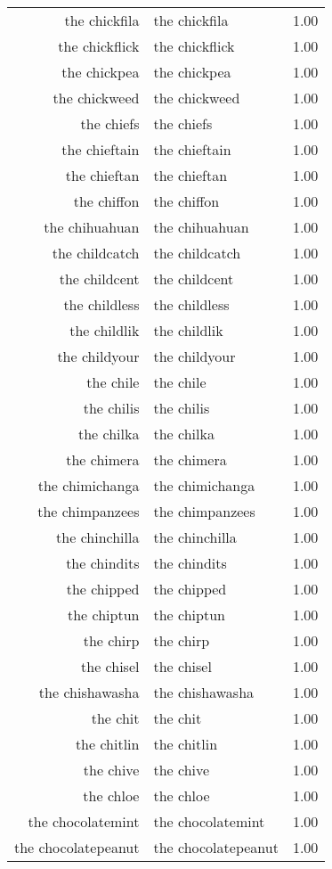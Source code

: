 \begin{table}[ht]
\begin{tabular}{rlr}
  the chickfila & the chickfila & 1.00 \\ 
  the chickflick & the chickflick & 1.00 \\ 
  the chickpea & the chickpea & 1.00 \\ 
  the chickweed & the chickweed & 1.00 \\ 
  the chiefs & the chiefs & 1.00 \\ 
  the chieftain & the chieftain & 1.00 \\ 
  the chieftan & the chieftan & 1.00 \\ 
  the chiffon & the chiffon & 1.00 \\ 
  the chihuahuan & the chihuahuan & 1.00 \\ 
  the childcatch & the childcatch & 1.00 \\ 
  the childcent & the childcent & 1.00 \\ 
  the childless & the childless & 1.00 \\ 
  the childlik & the childlik & 1.00 \\ 
  the childyour & the childyour & 1.00 \\ 
  the chile & the chile & 1.00 \\ 
  the chilis & the chilis & 1.00 \\ 
  the chilka & the chilka & 1.00 \\ 
  the chimera & the chimera & 1.00 \\ 
  the chimichanga & the chimichanga & 1.00 \\ 
  the chimpanzees & the chimpanzees & 1.00 \\ 
  the chinchilla & the chinchilla & 1.00 \\ 
  the chindits & the chindits & 1.00 \\ 
  the chipped & the chipped & 1.00 \\ 
  the chiptun & the chiptun & 1.00 \\ 
  the chirp & the chirp & 1.00 \\ 
  the chisel & the chisel & 1.00 \\ 
  the chishawasha & the chishawasha & 1.00 \\ 
  the chit & the chit & 1.00 \\ 
  the chitlin & the chitlin & 1.00 \\ 
  the chive & the chive & 1.00 \\ 
  the chloe & the chloe & 1.00 \\ 
  the chocolatemint & the chocolatemint & 1.00 \\ 
  the chocolatepeanut & the chocolatepeanut & 1.00 \\ 

\end{tabular}
\end{table}
